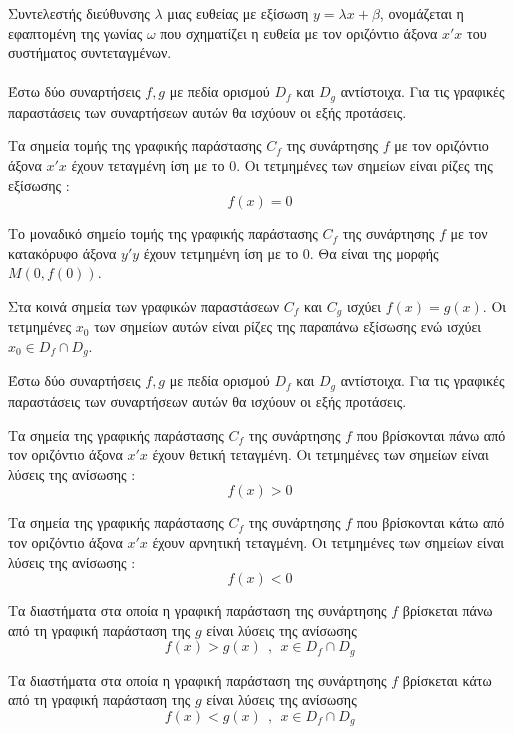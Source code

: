 \documentclass[twoside,nofonts,internet,shmeiwseis]{thewria}
\begin{document}
Συντελεστής διεύθυνσης $ \lambda $ μιας ευθείας με εξίσωση $ y=\lambda x+\beta $, ονομάζεται η εφαπτομένη της γωνίας $ \omega $ που σχηματίζει η ευθεία με τον οριζόντιο άξονα $ x'x $ του συστήματος συντεταγμένων.\\\\
\thewrhmata
{}
Έστω δύο συναρτήσεις $ f,g $ με πεδία ορισμού $ D_f $ και $ D_g $ αντίστοιχα. Για τις γραφικές παραστάσεις των συναρτήσεων αυτών θα ισχύουν οι εξής προτάσεις.
\begin{rlist}
\item Τα σημεία τομής της γραφικής παράστασης $ C_f $ της συνάρτησης $ f $ με τον οριζόντιο άξονα $ x'x $ έχουν τεταγμένη ίση με το $ 0 $. Οι τετμημένες των σημείων είναι ρίζες της εξίσωσης :
\[ f(x)=0 \]
\item Το μοναδικό σημείο τομής της γραφικής παράστασης $ C_f $ της συνάρτησης $ f $ με τον κατακόρυφο άξονα $ y'y $ έχουν τετμημένη ίση με το $ 0 $. Θα είναι της μορφής $ M(0,f(0)) $.
\item Στα κοινά σημεία των γραφικών παραστάσεων $ C_f $ και $ C_g $ ισχύει $ f(x)=g(x) $. Οι τετμημένες $ x_0 $ των σημείων αυτών είναι ρίζες της παραπάνω εξίσωσης ενώ ισχύει $ x_0\in D_f\cap D_g $.
\end{rlist}
Έστω δύο συναρτήσεις $ f,g $ με πεδία ορισμού $ D_f $ και $ D_g $ αντίστοιχα. Για τις γραφικές παραστάσεις των συναρτήσεων αυτών θα ισχύουν οι εξής προτάσεις.
\begin{rlist}
\item Τα σημεία της γραφικής παράστασης $ C_f $ της συνάρτησης $ f $ που βρίσκονται πάνω από τον οριζόντιο άξονα $ x'x $ έχουν θετική τεταγμένη. Οι τετμημένες των σημείων είναι λύσεις της ανίσωσης :
\[ f(x)>0 \]
\item Τα σημεία της γραφικής παράστασης $ C_f $ της συνάρτησης $ f $ που βρίσκονται κάτω από τον οριζόντιο άξονα $ x'x $ έχουν αρνητική τεταγμένη. Οι τετμημένες των σημείων είναι λύσεις της ανίσωσης :
\[ f(x)<0 \]
\item Τα διαστήματα στα οποία η γραφική παράσταση της συνάρτησης $ f $ βρίσκεται πάνω από τη γραφική παράσταση της $ g $ είναι λύσεις της ανίσωσης \[ f(x)>g(x)\ \ ,\ \ x\in D_f\cap D_g \]
\item Τα διαστήματα στα οποία η γραφική παράσταση της συνάρτησης $ f $ βρίσκεται κάτω από τη γραφική παράσταση της $ g $ είναι λύσεις της ανίσωσης \[ f(x)<g(x)\ \ ,\ \ x\in D_f\cap D_g \]
\end{rlist}
\end{document}
